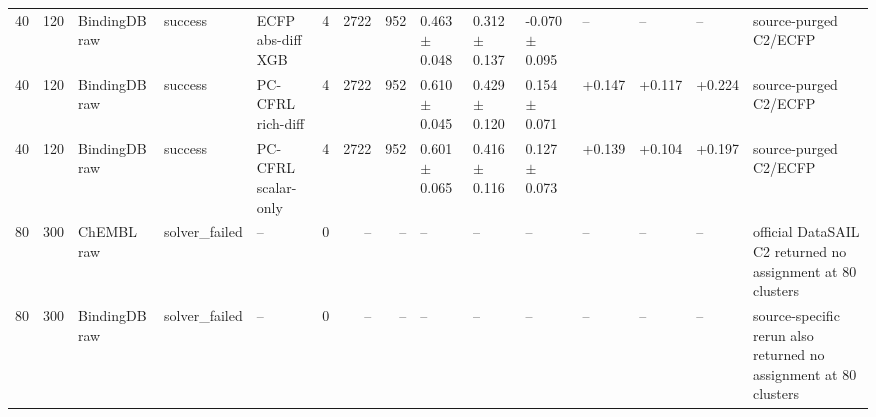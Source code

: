 \begin{table}[!t]
{\begin{tabular}{rrlllrrrlllllll}
40 & 120 & BindingDB raw & success & ECFP abs-diff XGB & 4 & 2722 & 952 & 0.463 $\pm$ 0.048 & 0.312 $\pm$ 0.137 & -0.070 $\pm$ 0.095 & -- & -- & -- & source-purged C2/ECFP \\
40 & 120 & BindingDB raw & success & PC-CFRL rich-diff & 4 & 2722 & 952 & 0.610 $\pm$ 0.045 & 0.429 $\pm$ 0.120 & 0.154 $\pm$ 0.071 & +0.147 & +0.117 & +0.224 & source-purged C2/ECFP \\
40 & 120 & BindingDB raw & success & PC-CFRL scalar-only & 4 & 2722 & 952 & 0.601 $\pm$ 0.065 & 0.416 $\pm$ 0.116 & 0.127 $\pm$ 0.073 & +0.139 & +0.104 & +0.197 & source-purged C2/ECFP \\
80 & 300 & ChEMBL raw & solver\_failed & -- & 0 & -- & -- & -- & -- & -- & -- & -- & -- & official DataSAIL C2 returned no assignment at 80 clusters \\
80 & 300 & BindingDB raw & solver\_failed & -- & 0 & -- & -- & -- & -- & -- & -- & -- & -- & source-specific rerun also returned no assignment at 80 clusters \\
\bottomrule
\end{tabular}%
}
\end{table}
